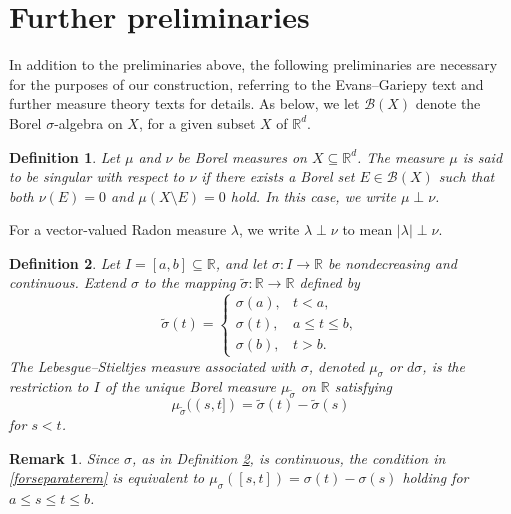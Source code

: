 \documentclass[10pt,a4paper]{amsart}
\newtheorem{remark}{Remark}
\newtheorem{definition}{Definition}
\begin{document}
\section{Further preliminaries}
 In addition to the preliminaries above, the following preliminaries are necessary for the purposes of our construction, referring to the Evans--Gariepy text 
 \cite{EvansGariepy2015} and further measure theory texts for details. As below, we let $\mathcal B(X)$ 
 denote the 
 Borel $\sigma$-algebra on $X$, for a given subset $X$ of $\mathbb{R}^{d}$. 
 
\begin{definition}\label{formalsingular}
 Let \(\mu\) and \(\nu\) be Borel measures on \(X\subseteq\mathbb R^d\). The measure
 \(\mu\) is said to be \emph{singular} with respect to \(\nu\) 
 if there exists a Borel set \(E\in\mathcal B(X)\) such that
 both $\nu(E)=0$ and 
 $\mu(X\setminus E)=0$ hold. 
 In this case, we write $
\mu\perp\nu$. 
 \end{definition}

 For a vector-valued Radon measure \(\lambda\), we write \(\lambda\perp\nu\) to mean \(|\lambda|\perp\nu\).

\begin{definition}\label{defineLSm}
Let \(I=[a,b]\subseteq\mathbb R\), and let
\(\sigma:I\to\mathbb R\) be nondecreasing and continuous. Extend
 \(\sigma\) to the mapping \(\widetilde\sigma:\mathbb R\to\mathbb R\) defined by
$$
\widetilde\sigma(t)=
\begin{cases}
\sigma(a), & t<a,\\
\sigma(t), & a\le t\le b,\\
\sigma(b), & t>b.
\end{cases}
$$
The \emph{Lebesgue--Stieltjes measure} associated with \(\sigma\), denoted 
 \(\mu_\sigma\) or \(d\sigma\), is the restriction to \(I\) of the unique
Borel measure \(\mu_{\widetilde\sigma}\) on \(\mathbb R\) satisfying
\begin{equation}\label{forseparaterem}
\mu_{\widetilde\sigma}((s,t])
 =
\widetilde\sigma(t)-\widetilde\sigma(s)
\end{equation}
 for $s < t$. 
\end{definition}

\begin{remark}
 Since \(\sigma\), as in Definition \ref{defineLSm}, is continuous, the condition in \eqref{forseparaterem} 
 is equivalent to 
$
\mu_\sigma([s,t])
=
\sigma(t)-\sigma(s)
$ holding for 
$ a \leq s \leq t \leq b$. 
\end{remark}
\end{document}
